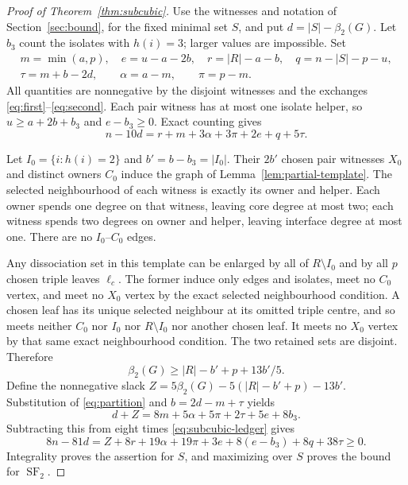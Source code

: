 \documentclass[11pt]{article}
\newcommand{\SF}{\operatorname{SF}_2}
\newcommand{\diss}{\beta_2}
\begin{document}
\begin{proof}[Proof of Theorem~\ref{thm:subcubic}]
Use the witnesses and notation of Section~\ref{sec:bound}, for the fixed
minimal set $S$, and put $d=|S|-\diss(G)$.
Let $b_3$ count the isolates with $h(i)=3$; larger values are impossible.
Set
\[
\begin{gathered}
 m=\min(a,p),\quad e=u-a-2b,\quad r=|R|-a-b,\quad
 q=n-|S|-p-u,\\
 \tau=m+b-2d,\qquad \alpha=a-m,\qquad \pi=p-m.
\end{gathered}
\]
All quantities are nonnegative by the disjoint witnesses and the
exchanges \eqref{eq:first}--\eqref{eq:second}. Each pair witness
has at most one isolate helper, so $u\ge a+2b+b_3$ and $e-b_3\ge0$.
Exact counting gives
\begin{equation}\label{eq:subcubic-ledger}
 n-10d=r+m+3\alpha+3\pi+2e+q+5\tau.
\end{equation}

Let $I_0=\{i:h(i)=2\}$ and $b'=b-b_3=|I_0|$.
Their $2b'$ chosen pair witnesses $X_0$ and distinct owners $C_0$
induce the graph of Lemma~\ref{lem:partial-template}.
The selected neighbourhood of each witness is exactly its owner and
helper. Each owner spends one degree on that witness, leaving core
degree at most two; each witness spends two degrees on owner and helper,
leaving interface degree at most one. There are no $I_0$--$C_0$ edges.

Any dissociation set in this template can be enlarged by all of
$R\setminus I_0$ and by all $p$ chosen triple leaves $\ell_c$.
The former induce only edges and isolates, meet no $C_0$ vertex,
and meet no $X_0$ vertex by the exact selected neighbourhood condition.
A chosen leaf has its unique selected neighbour at its omitted triple
centre, and so meets neither $C_0$ nor $I_0$ nor $R\setminus I_0$ nor
another chosen leaf. It meets no $X_0$ vertex by that same exact
neighbourhood condition. The two retained sets are disjoint. Therefore
\[
 \diss(G)\ge |R|-b'+p+13b'/5.
\]
Define the nonnegative slack
$Z=5\diss(G)-5(|R|-b'+p)-13b'$.
Substitution of \eqref{eq:partition} and $b=2d-m+\tau$ yields
\[
 d+Z=8m+5\alpha+5\pi+2\tau+5e+8b_3.
\]
Subtracting this from eight times \eqref{eq:subcubic-ledger} gives
\begin{equation}\label{eq:subcubic-cycle-ledger}
 \boxed{8n-81d
 =Z+8r+19\alpha+19\pi+3e+8(e-b_3)+8q+38\tau\ge0.}
\end{equation}
Integrality proves the assertion for $S$, and maximizing over $S$
proves the bound for $\SF$.
\end{proof}
\end{document}
